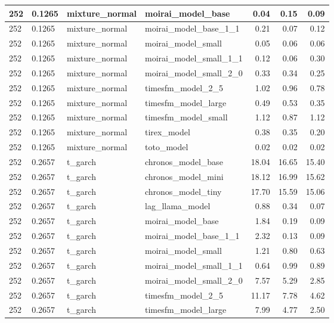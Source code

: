 {\begin{tabular}{llllrrr}
\midrule
252 & 0.1265 & mixture\_normal & moirai\_model\_base & 0.04 & 0.15 & 0.09 \\
\midrule
252 & 0.1265 & mixture\_normal & moirai\_model\_base\_1\_1 & 0.21 & 0.07 & 0.12 \\
\midrule
252 & 0.1265 & mixture\_normal & moirai\_model\_small & 0.05 & 0.06 & 0.06 \\
\midrule
252 & 0.1265 & mixture\_normal & moirai\_model\_small\_1\_1 & 0.12 & 0.06 & 0.30 \\
\midrule
252 & 0.1265 & mixture\_normal & moirai\_model\_small\_2\_0 & 0.33 & 0.34 & 0.25 \\
\midrule
252 & 0.1265 & mixture\_normal & timesfm\_model\_2\_5 & 1.02 & 0.96 & 0.78 \\
\midrule
252 & 0.1265 & mixture\_normal & timesfm\_model\_large & 0.49 & 0.53 & 0.35 \\
\midrule
252 & 0.1265 & mixture\_normal & timesfm\_model\_small & 1.12 & 0.87 & 1.12 \\
\midrule
252 & 0.1265 & mixture\_normal & tirex\_model & 0.38 & 0.35 & 0.20 \\
\midrule
252 & 0.1265 & mixture\_normal & toto\_model & 0.02 & 0.02 & 0.02 \\
\midrule
252 & 0.2657 & t\_garch & chronos\_model\_base & 18.04 & 16.65 & 15.40 \\
\midrule
252 & 0.2657 & t\_garch & chronos\_model\_mini & 18.12 & 16.99 & 15.62 \\
\midrule
252 & 0.2657 & t\_garch & chronos\_model\_tiny & 17.70 & 15.59 & 15.06 \\
\midrule
252 & 0.2657 & t\_garch & lag\_llama\_model & 0.88 & 0.34 & 0.07 \\
\midrule
252 & 0.2657 & t\_garch & moirai\_model\_base & 1.84 & 0.19 & 0.09 \\
\midrule
252 & 0.2657 & t\_garch & moirai\_model\_base\_1\_1 & 2.32 & 0.13 & 0.09 \\
\midrule
252 & 0.2657 & t\_garch & moirai\_model\_small & 1.21 & 0.80 & 0.63 \\
\midrule
252 & 0.2657 & t\_garch & moirai\_model\_small\_1\_1 & 0.64 & 0.99 & 0.89 \\
\midrule
252 & 0.2657 & t\_garch & moirai\_model\_small\_2\_0 & 7.57 & 5.29 & 2.85 \\
\midrule
252 & 0.2657 & t\_garch & timesfm\_model\_2\_5 & 11.17 & 7.78 & 4.62 \\
\midrule
252 & 0.2657 & t\_garch & timesfm\_model\_large & 7.99 & 4.77 & 2.50 \\

\end{tabular}}
